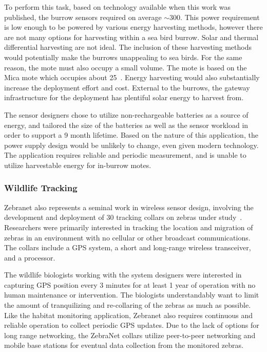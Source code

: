 To perform this task, based on technology available when this work was published, the burrow sensors required on average $\sim$300\ssi{\micro\watt}. This power requirement is low enough to be powered by various energy harvesting methods, however there are not many options for harvesting within a sea bird burrow. Solar and thermal differential harvesting are not ideal. The inclusion of these harvesting methods would potentially make the burrows unappealing to sea birds. For the same reason, the mote must also occupy a small volume. The mote is based on the Mica mote which occupies about 25\ssi{\centi\meter\cubed}~\cite{hill2002wireless}.
Energy harvesting would also substantially increase the deployment effort and cost.
External to the burrows, the gateway infrastructure for the deployment has plentiful solar energy to harvest from.

The sensor designers chose to utilize non-rechargeable batteries as a source of energy, and tailored the size of the batteries as well as the sensor workload in order to support a 9 month lifetime.
Based on the nature of this application, the power supply design would be unlikely to change, even given modern technology.
The application requires reliable and periodic measurement, and is unable to utilize harvestable energy for in-burrow motes.

\subsubsection{Wildlife Tracking}
Zebranet also represents a seminal work in wireless sensor design, involving the development and deployment of 30 tracking collars on zebras under study~\cite{juang2002energy}. Researchers were primarily interested in tracking the location and migration of zebras in an environment with no cellular or other broadcast communications. The collars include a GPS system, a short and long-range wireless transceiver, and a processor.

The wildlife biologists working with the system designers were interested in capturing GPS position every 3 minutes for at least 1 year of operation with no human maintenance or intervention. The biologists understandably want to limit the amount of tranquilizing and re-collaring of the zebras as much as possible. Like the habitat monitoring application, Zebranet also requires continuous and reliable operation to collect periodic GPS updates. Due to the lack of options for long range networking, the ZebraNet collars utilize peer-to-peer networking and mobile base stations for eventual data collection from the monitored zebras.


